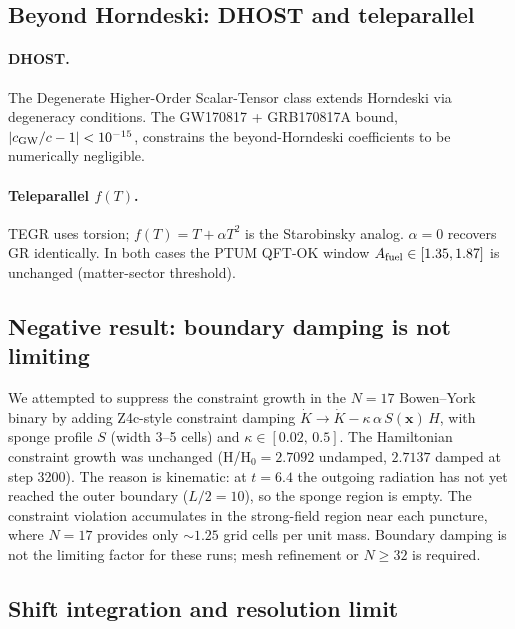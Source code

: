 \subsection{Beyond Horndeski: DHOST and teleparallel}
\paragraph{DHOST.}
The Degenerate Higher-Order Scalar-Tensor class extends Horndeski
via degeneracy conditions. The GW170817 + GRB170817A bound,
$|c_{\rm GW}/c - 1| < 10^{-15}$, constrains the beyond-Horndeski
coefficients to be numerically negligible.
\paragraph{Teleparallel $f(T)$.}
TEGR uses torsion; $f(T) = T + \alpha T^2$ is the Starobinsky
analog. $\alpha = 0$ recovers GR identically.
In both cases the PTUM QFT-OK window $A_{\rm fuel} \in [1.35,
1.87]$ is unchanged (matter-sector threshold).

\subsection{Negative result: boundary damping is not limiting}

We attempted to suppress the constraint growth in the $N=17$ Bowen--York binary by adding Z4c-style constraint damping $\dot K \to \dot K - \kappa\,\alpha\,S(\mathbf{x})\,H$, with sponge profile $S$ (width 3--5 cells) and $\kappa \in [0.02,\,0.5]$. The Hamiltonian constraint growth was unchanged (H/H$_0 = 2.7092$ undamped, $2.7137$ damped at step 3200). The reason is kinematic: at $t = 6.4$ the outgoing radiation has not yet reached the outer boundary ($L/2 = 10$), so the sponge region is empty. The constraint violation accumulates in the strong-field region near each puncture, where $N=17$ provides only $\sim 1.25$ grid cells per unit mass. Boundary damping is not the limiting factor for these runs; mesh refinement or $N \ge 32$ is required.

\subsection{Shift integration and resolution limit}

